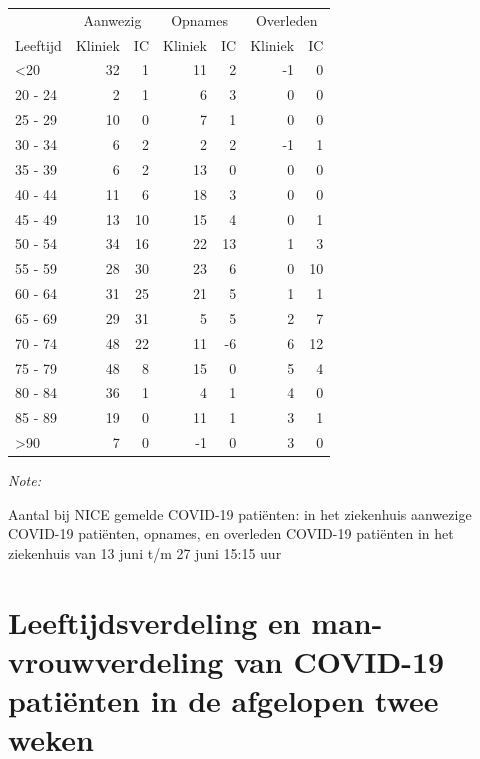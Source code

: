 \documentclass[
  english,
  man,floatsintext]{apa6}
\begin{document}
\begin{table}
\centering\begingroup\fontsize{10}{12}\selectfont

\begin{threeparttable}
\begin{tabular}{lrrrrrr}
\toprule
\multicolumn{1}{c}{ } & \multicolumn{2}{c}{Aanwezig} & \multicolumn{2}{c}{Opnames} & \multicolumn{2}{c}{Overleden} \\
\cmidrule(l{3pt}r{3pt}){2-3} \cmidrule(l{3pt}r{3pt}){4-5} \cmidrule(l{3pt}r{3pt}){6-7}
Leeftijd & Kliniek & IC & Kliniek & IC & Kliniek & IC\\
\midrule
<20 & 32 & 1 & 11 & 2 & -1 & 0\\
20 - 24 & 2 & 1 & 6 & 3 & 0 & 0\\
25 - 29 & 10 & 0 & 7 & 1 & 0 & 0\\
30 - 34 & 6 & 2 & 2 & 2 & -1 & 1\\
35 - 39 & 6 & 2 & 13 & 0 & 0 & 0\\
40 - 44 & 11 & 6 & 18 & 3 & 0 & 0\\
45 - 49 & 13 & 10 & 15 & 4 & 0 & 1\\
50 - 54 & 34 & 16 & 22 & 13 & 1 & 3\\
55 - 59 & 28 & 30 & 23 & 6 & 0 & 10\\
60 - 64 & 31 & 25 & 21 & 5 & 1 & 1\\
65 - 69 & 29 & 31 & 5 & 5 & 2 & 7\\
70 - 74 & 48 & 22 & 11 & -6 & 6 & 12\\
75 - 79 & 48 & 8 & 15 & 0 & 5 & 4\\
80 - 84 & 36 & 1 & 4 & 1 & 4 & 0\\
85 - 89 & 19 & 0 & 11 & 1 & 3 & 1\\
>90 & 7 & 0 & -1 & 0 & 3 & 0\\
\bottomrule
\end{tabular}
\begin{tablenotes}
\item \textit{Note: } 
\item Aantal bij NICE gemelde COVID-19 patiënten: in het ziekenhuis aanwezige COVID-19 patiënten, opnames, en overleden COVID-19 patiënten in het ziekenhuis van 13 juni t/m 27 juni 15:15 uur
\end{tablenotes}
\end{threeparttable}
\endgroup{}
\end{table}

\newpage

\hypertarget{leeftijdsverdeling-en-man-vrouwverdeling-van-covid-19-patiuxebnten-in-de-afgelopen-twee-weken}{%
\section{Leeftijdsverdeling en man-vrouwverdeling van COVID-19 patiënten in de afgelopen twee weken}\label{leeftijdsverdeling-en-man-vrouwverdeling-van-covid-19-patiuxebnten-in-de-afgelopen-twee-weken}}
\end{document}
